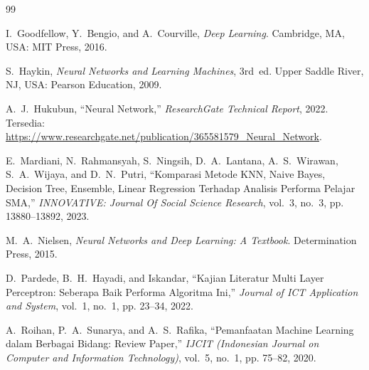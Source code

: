 \documentclass[a4paper,oneside,12pt]{report}
\begin{document}
\begin{thebibliography}{99}

I.~Goodfellow, Y.~Bengio, and A.~Courville, \textit{Deep Learning}. Cambridge, MA, USA: MIT Press, 2016.

S.~Haykin, \textit{Neural Networks and Learning Machines}, 3rd~ed. Upper Saddle River, NJ, USA: Pearson Education, 2009.

A.~J.~Hukubun, ``Neural Network,'' \textit{ResearchGate Technical Report}, 2022. Tersedia: \url{https://www.researchgate.net/publication/365581579_Neural_Network}.

E.~Mardiani, N.~Rahmansyah, S.~Ningsih, D.~A.~Lantana, A.~S.~Wirawan, S.~A.~Wijaya, and D.~N.~Putri, ``Komparasi Metode KNN, Naive Bayes, Decision Tree, Ensemble, Linear Regression Terhadap Analisis Performa Pelajar SMA,'' \textit{INNOVATIVE: Journal Of Social Science Research}, vol.~3, no.~3, pp. 13880--13892, 2023.

M.~A.~Nielsen, \textit{Neural Networks and Deep Learning: A Textbook}. Determination Press, 2015.

D.~Pardede, B.~H.~Hayadi, and Iskandar, ``Kajian Literatur Multi Layer Perceptron: Seberapa Baik Performa Algoritma Ini,'' \textit{Journal of ICT Application and System}, vol.~1, no.~1, pp. 23--34, 2022.

A.~Roihan, P.~A.~Sunarya, and A.~S.~Rafika, ``Pemanfaatan Machine Learning dalam Berbagai Bidang: Review Paper,'' \textit{IJCIT (Indonesian Journal on Computer and Information Technology)}, vol.~5, no.~1, pp. 75--82, 2020.

\end{thebibliography}
\end{document}
